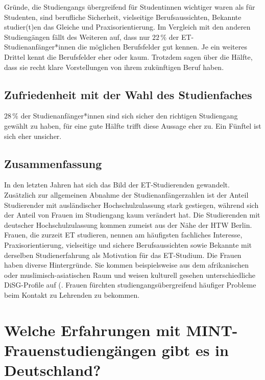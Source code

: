 \documentclass[a4paper, 12 pt]{IEEEtran}
\begin{document}
Gründe, die Studiengangs übergreifend für Studentinnen wichtiger waren als für Studenten, sind berufliche Sicherheit, vielseitige Berufsaussichten, Bekannte studier(t)en das Gleiche und Praxisorientierung.
Im Vergleich mit den anderen Studiengängen fällt des Weiteren auf, dass nur $22\,\%$ der ET-Studienanfänger*innen die möglichen Berufsfelder gut kennen. Je ein weiteres Drittel kennt die Berufsfelder eher oder kaum. Trotzdem sagen über die Hälfte, dass sie recht klare Vorstellungen von ihrem zukünftigen Beruf haben. 

\subsection{Zufriedenheit mit der Wahl des Studienfaches}
$28\,\%$ der Studienanfänger*innen sind sich sicher den richtigen Studiengang gewählt zu haben, für eine gute Hälfte trifft diese Aussage eher zu. Ein Fünftel ist sich eher unsicher. \cite{Rei.08.02.2019}




\subsection{Zusammenfassung}

In den letzten Jahren hat sich das Bild der ET-Studierenden gewandelt. Zusätzlich zur allgemeinen Abnahme der Studienanfängerzahlen ist der Anteil Studierender mit ausländischer Hochschulzulassung stark gestiegen, während sich der Anteil von Frauen im Studiengang kaum verändert hat. Die Studierenden mit deutscher Hochschulzulassung kommen zumeist aus der Nähe der HTW Berlin. Frauen, die zurzeit ET studieren, nennen am häufigsten fachliches Interesse, Praxisorientierung, vielseitige und sichere Berufsaussichten sowie Bekannte mit derselben Studienerfahrung als Motivation für das ET-Studium. Die Frauen haben diverse Hintergründe. Sie kommen beispielsweise aus dem afrikanischen oder muslimisch-asiatischen Raum und weisen kulturell gesehen unterschiedliche DiSG-Profile auf (\cite{DeutschesInstitutfurMarketing.2022}. Frauen fürchten studiengangsübergreifend häufiger Probleme beim Kontakt zu Lehrenden zu bekommen. \cite{Rei.08.02.2019}

\section{Welche Erfahrungen mit MINT-Frauenstudiengängen gibt es in Deutschland?}
\label{sec:FSGinD}
\end{document}
